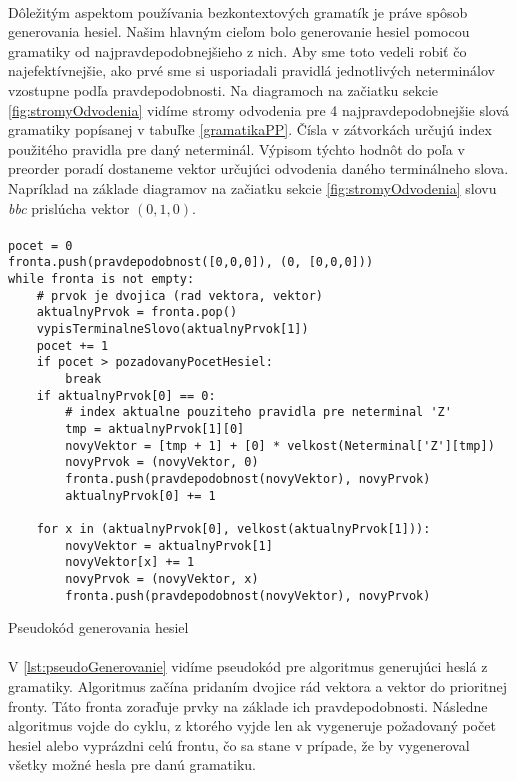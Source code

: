 \paragraph{}
Dôležitým aspektom používania bezkontextových gramatík je práve spôsob generovania hesiel. Našim hlavným cieľom bolo generovanie hesiel pomocou gramatiky od najpravdepodobnejšieho z nich. Aby sme toto vedeli robiť čo najefektívnejšie, ako prvé sme si usporiadali pravidlá jednotlivých neterminálov vzostupne podľa pravdepodobnosti. Na diagramoch na začiatku sekcie \ref{fig:stromyOdvodenia} vidíme stromy odvodenia pre 4 najpravdepodobnejšie slová gramatiky popísanej v tabuľke \ref{gramatikaPP}. Čísla v zátvorkách určujú index použitého pravidla pre daný neterminál. Výpisom týchto hodnôt do poľa v preorder poradí dostaneme vektor určujúci odvodenia daného terminálneho slova. Napríklad na základe diagramov na začiatku sekcie \ref{fig:stromyOdvodenia} slovu \emph{bbc} prislúcha vektor \((0,1,0)\).

\paragraph{}
\begin{listing}
\begin{verbatim}
pocet = 0
fronta.push(pravdepodobnost([0,0,0]), (0, [0,0,0]))
while fronta is not empty:
	# prvok je dvojica (rad vektora, vektor)
	aktualnyPrvok = fronta.pop()
	vypisTerminalneSlovo(aktualnyPrvok[1])
	pocet += 1
	if pocet > pozadovanyPocetHesiel:
		break
	if aktualnyPrvok[0] == 0:
		# index aktualne pouziteho pravidla pre neterminal 'Z'
		tmp = aktualnyPrvok[1][0]
		novyVektor = [tmp + 1] + [0] * velkost(Neterminal['Z'][tmp])
		novyPrvok = (novyVektor, 0)
		fronta.push(pravdepodobnost(novyVektor), novyPrvok)
		aktualnyPrvok[0] += 1

	for x in (aktualnyPrvok[0], velkost(aktualnyPrvok[1])):
		novyVektor = aktualnyPrvok[1]
		novyVektor[x] += 1
		novyPrvok = (novyVektor, x)
		fronta.push(pravdepodobnost(novyVektor), novyPrvok)
\end{verbatim}
\caption{Pseudokód generovania hesiel}
\label{lst:pseudoGenerovanie}
\end{listing}

\paragraph{}
V \ref{lst:pseudoGenerovanie} vidíme pseudokód pre algoritmus generujúci heslá z gramatiky. Algoritmus začína pridaním dvojice rád vektora a vektor do prioritnej fronty. Táto fronta zoraďuje prvky na základe ich pravdepodobnosti. Následne algoritmus vojde do cyklu, z ktorého vyjde len ak vygeneruje požadovaný počet hesiel alebo vyprázdni celú frontu, čo sa stane v prípade, že by vygeneroval všetky možné hesla pre danú gramatiku.

